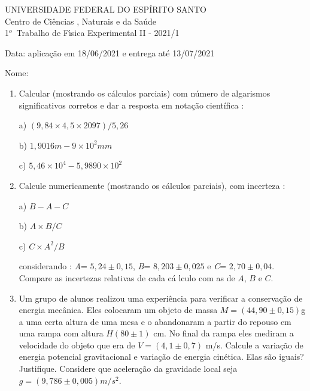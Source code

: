 \documentclass[a4paper,11pt]{report}
\begin{document}
\begin{center}
{\large UNIVERSIDADE FEDERAL DO ESP\'{I}RITO SANTO} \\[0pt]
{\large Centro de Ci\^{e}ncias , Naturais e da Sa\'{u}de} \\[0pt]
\vspace*{0.5cm} {\large 1}$^{o}${\large \ Trabalho de F\'{\i}sica Experimental II - 2021/1}

Data: aplica\c{c}\~{a}o em 18/06/2021 e entrega at\'{e} 13/07/2021
\end{center}

Nome: 

\begin{enumerate}
\item Calcular (mostrando os c\'{a}lculos parciais) com 
n\'{u}mero de algarismos significativos corretos e dar a resposta em 
nota\c{c}\~{a}o cient\'{i}fica :

a) $(9,84\times 4,5\times 2097)/5,26$\hspace{7.5cm}

b) $1,9016m-9\times 10^{2}mm$

c) $5,46\times 10^{4}-5,9890\times 10^{2}$

\item Calcule numericamente (mostrando os c\'{a}lculos 
parciais), com incerteza :

a) $B-A-C$

b) $A\times B / C$

c) $C\times A^{2}/B$

considerando : \textit{A}= $5,24\pm 0,15$, \textit{B}= $8,203\pm 0,025$ e 
\textit{C}= $2,70\pm 0,04$. Compare as incertezas relativas de cada c\'{a}%
lculo com as de $A$, $B$ e $C$.

\item Um grupo de alunos realizou uma experi\^{e}ncia para verificar a conserva\c{c}\~{a}o de energia mec\^{a}nica. Eles colocaram um objeto de massa $M = (44,90 \pm 0,15)$g a uma certa altura de uma mesa e o abandonaram a partir do repouso em  uma rampa com altura $H (80 \pm 1)$ cm. No final da rampa eles mediram a velocidade do objeto que era de $V = (4,1 \pm 0,7)$ m/s. Calcule a varia\c{c}\~{a}o de energia potencial gravitacional e varia\c{c}\~{a}o de energia cin\'{e}tica. Elas s\~{a}o iguais? Justifique. Considere que acelera\c{c}\~{a}o da gravidade local seja $g = (9,786 \pm 0,005) m/s^{2}$.


\end{enumerate}
\end{document}

